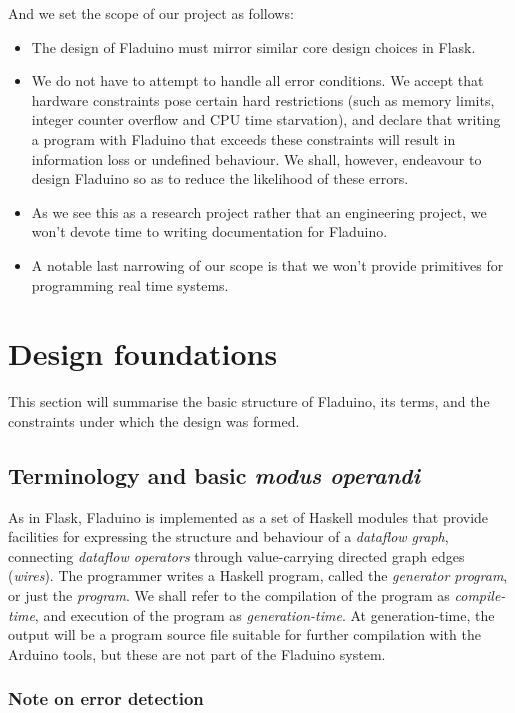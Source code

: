 \documentclass[a4paper, oneside, final]{memoir}
\begin{document}
And we set the scope of our project as follows:
\begin{itemize}
\item The design of Fladuino must mirror similar core design choices
  in Flask.
\item We do not have to attempt to handle all error conditions.  We
  accept that hardware constraints pose certain hard restrictions
  (such as memory limits, integer counter overflow and CPU time
  starvation), and declare that writing a program with Fladuino that
  exceeds these constraints will result in information loss or
  undefined behaviour.  We shall, however, endeavour to design
  Fladuino so as to reduce the likelihood of these errors.
\item As we see this as a research project rather that an engineering
  project, we won't devote time to writing documentation for Fladuino.
\item A notable last narrowing of our scope is that we won't provide
  primitives for programming real time systems.
\end{itemize}

\section{Design foundations}

This section will summarise the basic structure of Fladuino, its
terms, and the constraints under which the design was formed.

\subsection{Terminology and basic \textit{modus operandi}}

As in Flask, Fladuino is implemented as a set of Haskell modules that
provide facilities for expressing the structure and behaviour of a
\textit{dataflow graph}, connecting \textit{dataflow operators}
through value-carrying directed graph edges (\textit{wires}).  The
programmer writes a Haskell program, called the \textit{generator
  program}, or just the \textit{program}.  We shall refer to the
compilation of the program as \textit{compile-time}, and execution of
the program as \textit{generation-time}.  At generation-time, the
output will be a program source file suitable for further compilation
with the Arduino tools, but these are not part of the Fladuino system.

\subsubsection{Note on error detection}
\end{document}
